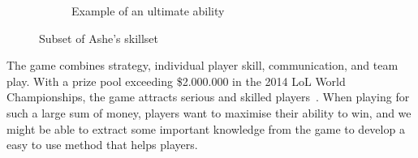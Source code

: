 \begin{figure}[!htb]
\begin{subfigure}[b]{0.49\textwidth}
          \caption{Example of an ultimate ability}
          \label{fig:enchanted}
        \end{subfigure}
        \caption{Subset of Ashe's skillset~\cite{ashe}}\label{fig:ashe}
\end{figure}

The game combines strategy, individual player skill, communication, and team play. With a prize pool exceeding \$2.000.000 in the 2014 LoL World Championships, the game attracts serious and skilled players~\cite{lolprize}. When playing for such a large sum of money, players want to maximise their ability to win, and we might be able to extract some important knowledge from the game to develop a easy to use method that helps players.

